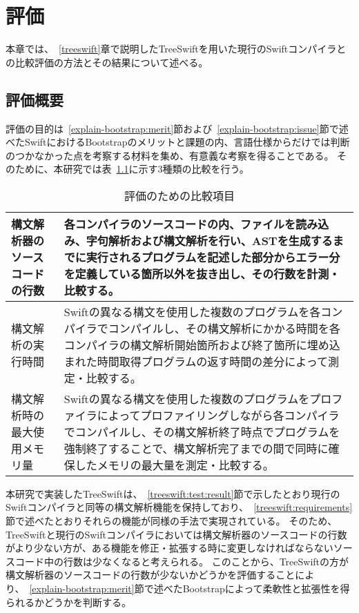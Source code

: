\chapter{評価}
\label{evaluation}

本章では、~\ref{treeswift}章で説明したTreeSwiftを用いた現行のSwiftコンパイラとの比較評価の方法とその結果について述べる。


\section{評価概要}

評価の目的は~\ref{explain-bootstrap:merit}節および~\ref{explain-bootstrap:issue}節で述べたSwiftにおけるBootstrapのメリットと課題の内、言語仕様からだけでは判断のつかなかった点を考察する材料を集め、有意義な考察を得ることである。
そのために、本研究では表~\ref{table:evaluation-items}に示す3種類の比較を行う。

\begin{table}[hb]
    \begin{center}
        \caption{評価のための比較項目}
        \begin{tabular}{|m{4cm}|m{11cm}|}
            \hline
            構文解析器のソースコードの行数 & 各コンパイラのソースコードの内、ファイルを読み込み、字句解析および構文解析を行い、ASTを生成するまでに実行されるプログラムを記述した部分からエラー分を定義している箇所以外を抜き出し、その行数を計測・比較する。 \\
            \hline
            構文解析の実行時間 & Swiftの異なる構文を使用した複数のプログラムを各コンパイラでコンパイルし、その構文解析にかかる時間を各コンパイラの構文解析開始箇所および終了箇所に埋め込まれた時間取得プログラムの返す時間の差分によって測定・比較する。 \\
            \hline
            構文解析時の最大使用メモリ量 & Swiftの異なる構文を使用した複数のプログラムをプロファイラによってプロファイリングしながら各コンパイラでコンパイルし、その構文解析終了時点でプログラムを強制終了することで、構文解析完了までの間で同時に確保したメモリの最大量を測定・比較する。 \\
            \hline
        \end{tabular}
        \label{table:evaluation-items}
    \end{center}
\end{table}

本研究で実装したTreeSwiftは、~\ref{treeswift:test:result}節で示したとおり現行のSwiftコンパイラと同等の構文解析機能を保持しており、~\ref{treeswift:requirements}節で述べたとおりそれらの機能が同様の手法で実現されている。
そのため、TreeSwiftと現行のSwiftコンパイラにおいては構文解析器のソースコードの行数がより少ない方が、ある機能を修正・拡張する時に変更しなければならないソースコード中の行数は少なくなると考えられる。
このことから、TreeSwiftの方が構文解析器のソースコードの行数が少ないかどうかを評価することにより、~\ref{explain-bootstrap:merit}節で述べたBootstrapによって柔軟性と拡張性を得られるかどうかを判断する。

